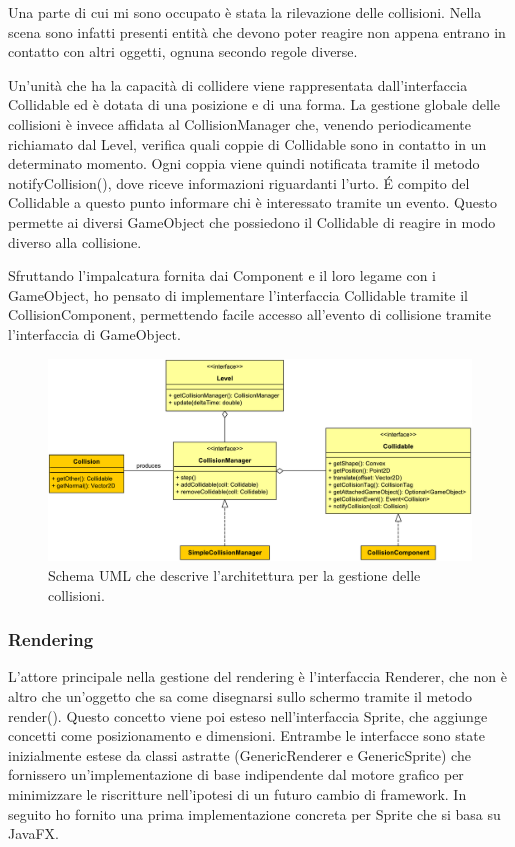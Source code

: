\documentclass[a4paper,12pt]{report}
\begin{document}
Una parte di cui mi sono occupato è stata la rilevazione delle collisioni.
Nella scena sono infatti presenti entità che devono poter reagire non appena entrano in contatto con altri oggetti, ognuna secondo regole diverse.

Un'unità che ha la capacità di collidere viene rappresentata dall'interfaccia Collidable ed è dotata di una posizione e di una forma.
La gestione globale delle collisioni è invece affidata al CollisionManager che, venendo periodicamente richiamato dal Level, verifica quali coppie di Collidable sono in contatto in un determinato momento.
Ogni coppia viene quindi notificata tramite il metodo notifyCollision(), dove riceve informazioni riguardanti l'urto.
É compito del Collidable a questo punto informare chi è interessato tramite un evento.
Questo permette ai diversi GameObject che possiedono il Collidable di reagire in modo diverso alla collisione.

Sfruttando l'impalcatura fornita dai Component e il loro legame con i GameObject, ho pensato di implementare l'interfaccia Collidable tramite il CollisionComponent, permettendo facile accesso all'evento di collisione tramite l'interfaccia di GameObject.

\begin{figure}[H]
\includegraphics[width=\linewidth]{img/collisions}
\caption{Schema UML che descrive l'architettura per la gestione delle collisioni.}
\label{img:collisions}
\end{figure}

\subsubsection*{Rendering}

L'attore principale nella gestione del rendering è l'interfaccia Renderer, che non è altro che un'oggetto che sa come disegnarsi sullo schermo tramite il metodo render().
Questo concetto viene poi esteso nell'interfaccia Sprite, che aggiunge concetti come posizionamento e dimensioni.
Entrambe le interfacce sono state inizialmente estese da classi astratte (GenericRenderer e GenericSprite) che fornissero un'implementazione di base indipendente dal motore grafico per minimizzare le riscritture nell'ipotesi di un futuro cambio di framework.
In seguito ho fornito una prima implementazione concreta per Sprite che si basa su JavaFX.
\end{document}

